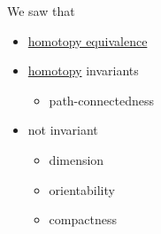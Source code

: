 \begin{prev}
	We saw that
	\begin{itemize}
		\item \hyperref[def:homotopy-equivalence]{homotopy equivalence}
		\item \hyperref[def:homotopy]{homotopy} invariants
		      \begin{itemize}
			      \item path-connectedness
		      \end{itemize}
		\item not invariant
		      \begin{itemize}
			      \item dimension
			      \item orientability
			      \item compactness
		      \end{itemize}
	\end{itemize}
\end{prev}

